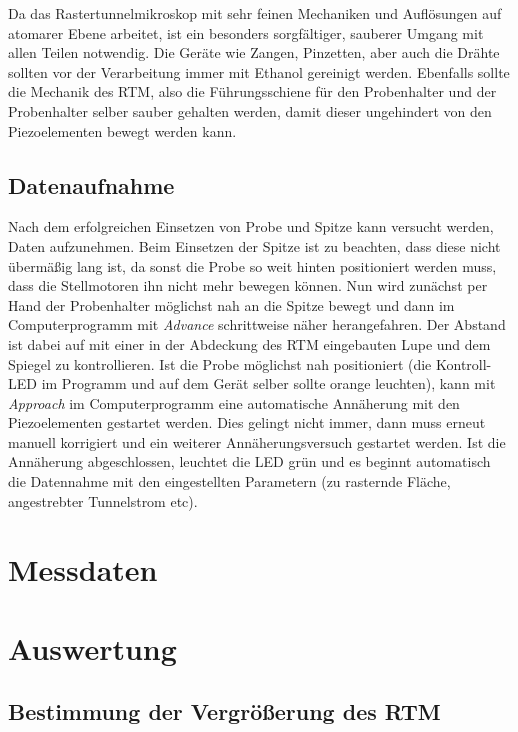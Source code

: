 \documentclass[10pt, a4paper]{article}
\begin{document}
Da das Rastertunnelmikroskop mit sehr feinen Mechaniken und Auflösungen auf atomarer Ebene arbeitet, ist ein besonders sorgfältiger, sauberer Umgang mit allen Teilen notwendig.
Die Geräte wie Zangen, Pinzetten, aber auch die Drähte sollten vor der Verarbeitung immer mit Ethanol gereinigt werden.
Ebenfalls sollte die Mechanik des RTM, also die Führungsschiene für den Probenhalter und der Probenhalter selber sauber gehalten werden, damit dieser ungehindert von den Piezoelementen bewegt werden kann.

\subsection{Datenaufnahme}

Nach dem erfolgreichen Einsetzen von Probe und Spitze kann versucht werden, Daten aufzunehmen.
Beim Einsetzen der Spitze ist zu beachten, dass diese nicht übermäßig lang ist, da sonst die Probe so weit hinten positioniert werden muss, dass die Stellmotoren ihn nicht mehr bewegen können.
Nun wird zunächst per Hand der Probenhalter möglichst nah an die Spitze bewegt und dann im Computerprogramm mit \textit{Advance} schrittweise näher herangefahren.
Der Abstand ist dabei auf mit einer in der Abdeckung des RTM eingebauten Lupe und dem Spiegel zu kontrollieren.
Ist die Probe möglichst nah positioniert (die Kontroll-LED im Programm und auf dem Gerät selber sollte orange leuchten), kann mit \textit{Approach} im Computerprogramm eine automatische Annäherung mit den Piezoelementen gestartet werden.
Dies gelingt nicht immer, dann muss erneut manuell korrigiert und ein weiterer Annäherungsversuch gestartet werden.
Ist die Annäherung abgeschlossen, leuchtet die LED grün und es beginnt automatisch die Datennahme mit den eingestellten Parametern (zu rasternde Fläche, angestrebter Tunnelstrom etc).

\section{Messdaten}


\section{Auswertung}

\subsection{Bestimmung der Vergrößerung des RTM}
\end{document}
